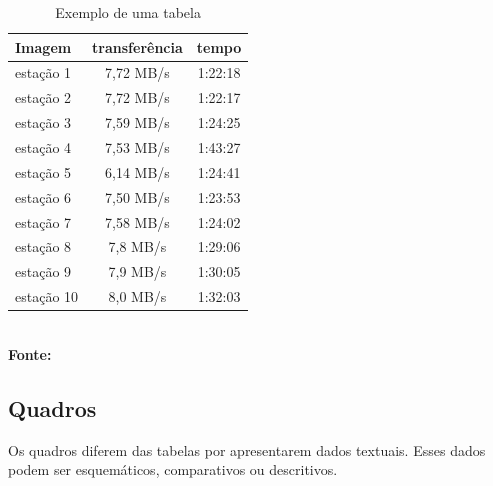 \begin{table}[htb]
	\centering
	\caption{\hspace{0.1cm} Exemplo de uma tabela}
	\vspace{-0.3cm} %
	\label{tab:tabela1}
	\begin{tabular}{l|c|c}
  \hline
    \textbf{Imagem}	& \textbf{transferência} & \textbf{tempo} \\
    \hline
     estação 1	& 7,72 MB/s &  1:22:18 \\
     estação 2	& 7,72 MB/s &  1:22:17 \\
     estação 3	& 7,59 MB/s & 1:24:25 \\
     estação 4  & 7,53 MB/s & 1:43:27 \\
     estação 5	& 6,14 MB/s  &  1:24:41 \\
     estação 6  &  7,50 MB/s & 1:23:53 \\
     estação 7  & 7,58 MB/s  &  1:24:02 \\
     estação 8  & 7,8 MB/s  &  1:29:06 \\
     estação 9  & 7,9 MB/s  &  1:30:05 \\
     estação 10 & 8,0 MB/s  &  1:32:03 \\
     \hline
 \end{tabular}
 	\vspace{.1cm}  %
	\small
	{\footnotesize\\ \textbf{Fonte: \cite{monog-fabio}}}
\end{table}

\subsection{\esp Quadros}

Os quadros diferem das tabelas por apresentarem dados textuais.
Esses dados podem ser esquemáticos, comparativos ou descritivos.

